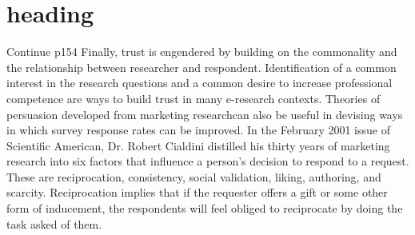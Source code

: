 \documentclass{beamer}
\begin{document}
\section{ heading}
\begin{frame}{Continue p154}
Finally, trust is engendered by building on the commonality and the relationship between researcher and respondent. 
Identification of a common interest in the research questions and a common desire to increase professional competence are ways to build trust in many e-research contexts. 
Theories of persuasion developed from marketing researchcan also be useful in devising ways in which survey response rates can be improved.
In the February 2001 issue of Scientific American, Dr. Robert Cialdini distilled his thirty years of marketing research into six factors that influence a person's decision to respond to a request. These are reciprocation, consistency, social validation, liking, authoring, and scarcity. Reciprocation implies that if the requester offers a gift or some other form of inducement, the respondents will feel obliged to reciprocate by doing the task asked of them.
\end{frame}
\end{document}
